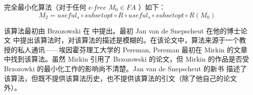 完全最小化算法（对于任何 $\epsilon$-$free$ $M_0\in FA$ ）如下：
$$  M_2 = useful_s \circ subsetopt \circ R \circ useful_s \circ subsetopt \circ R(M_0) $$

该算法最初由 Brzozowski 在 \cite{Brzo62} 中提出。最初 Jan van de Snepscheut 在他的博士论文 \cite{vdSn85}中提出该算法时，对该算法的描述是模糊的。在该论文中，算法来源于一个教授的私人通讯——埃因霍芬理工大学的 Pereman, Pereman 最初在 Mirkin 的文章 \cite{Mirk65} 中找到该算法。虽然 Mirkin 引用了 Brzozowski \cite{Brzo64} 的论文，但 Mirkin 的作品是否受 Brzozowki 的最小化工作的影响尚不清楚。Jan van de Snepscheut 的新书\cite{VDSn93} 描述了该算法，但既不提供该算法历史，也不提供该算法的引文（除了他自己的论文外）。
